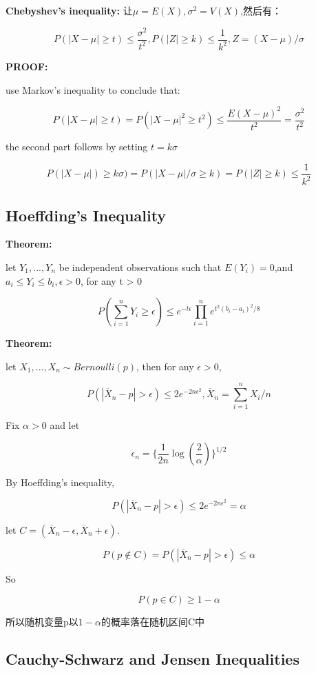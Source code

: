 \documentclass{ctexart}
\begin{document}
	\textbf{Chebyshev's inequality:}
	让\(\mu=E(X), \sigma^2=V(X)\),然后有：
	
	\[P(|X-\mu| \geq t) \leq \frac{\sigma^2}{t^2} , P(|Z| \geq k) \leq \frac{1}{k^2}, Z=(X-\mu)/\sigma\]
	
	\textbf{PROOF:}
	
	use Markov's inequality to conclude that:
	
	\[P(|X-\mu| \geq t) = P(|X-\mu|^2 \geq t^2) \leq \frac{E(X-\mu)^2}{t^2}=\frac{\sigma^2}{t^2}\]
	
	the second part follows by setting \(t = k\sigma\)
	
	\[P(|X-\mu|) \geq k\sigma) = P(|X-\mu|/\sigma \geq k) = P(|Z| \geq k) \leq \frac{1}{k^2}\]

	\subsection{Hoeffding's Inequality}
	
	\textbf{Theorem:}
	
	let \(Y_1,...,Y_n\) be independent observations such that \(E(Y_i) = 0\),and \(a_i \leq Y_i \leq b_i, \epsilon > 0\), for any t > 0
	
	\[P(\sum_{i=1}^{n}Y_i \geq \epsilon) \leq e^{-t\epsilon}\prod_{i=1}^{n}e^{t^2(b_i-a_i)^2/8}\]
	
	\textbf{Theorem:}
	
	let \(X_1,...,X_n \sim Bernoulli(p)\), then for any \(\epsilon > 0\),
	
	\[P(|\overline{X}_n-p| > \epsilon) \leq 2e^{-2n\epsilon^2}, \overline{X}_n=\sum_{i=1}^{n}X_i/n\]
	
	Fix \(\alpha > 0\) and let
	
	\[\epsilon_n = \{\frac{1}{2n}\log(\frac{2}{\alpha})\}^{1/2}\]
	
	By Hoeffding's inequality,
	
	\[P(|\overline{X}_n-p| > \epsilon) \leq 2e^{-2n\epsilon^2} = \alpha\]
	
	let \(C = (\overline{X}_n-\epsilon, \overline{X}_n+\epsilon)\).
	
	\[P(p \notin C) = P(|\overline{X}_n-p| > \epsilon) \leq \alpha\]
	
	So
	
	\[P(p \in C) \geq 1-\alpha\]
	
	所以随机变量p以\(1-\alpha\)的概率落在随机区间C中
	
	\subsection{Cauchy-Schwarz and Jensen Inequalities}
	
\end{document}
